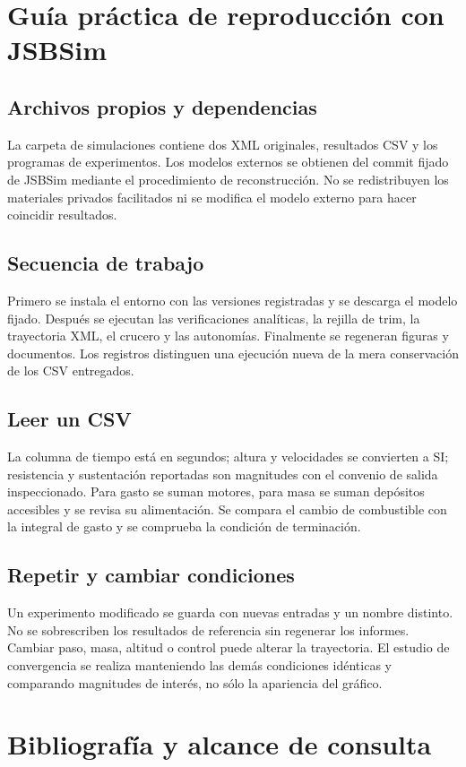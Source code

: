 \chapter{Guía práctica de reproducción con JSBSim}
\section{Archivos propios y dependencias}
La carpeta de simulaciones contiene dos XML originales, resultados CSV y los programas de experimentos. Los modelos externos se obtienen del commit fijado de JSBSim mediante el procedimiento de reconstrucción. No se redistribuyen los materiales privados facilitados ni se modifica el modelo externo para hacer coincidir resultados.

\section{Secuencia de trabajo}
Primero se instala el entorno con las versiones registradas y se descarga el modelo fijado. Después se ejecutan las verificaciones analíticas, la rejilla de trim, la trayectoria XML, el crucero y las autonomías. Finalmente se regeneran figuras y documentos. Los registros distinguen una ejecución nueva de la mera conservación de los CSV entregados.

\section{Leer un CSV}
La columna de tiempo está en segundos; altura y velocidades se convierten a SI; resistencia y sustentación reportadas son magnitudes con el convenio de salida inspeccionado. Para gasto se suman motores, para masa se suman depósitos accesibles y se revisa su alimentación. Se compara el cambio de combustible con la integral de gasto y se comprueba la condición de terminación.

\section{Repetir y cambiar condiciones}
Un experimento modificado se guarda con nuevas entradas y un nombre distinto. No se sobrescriben los resultados de referencia sin regenerar los informes. Cambiar paso, masa, altitud o control puede alterar la trayectoria. El estudio de convergencia se realiza manteniendo las demás condiciones idénticas y comparando magnitudes de interés, no sólo la apariencia del gráfico.

\chapter{Bibliografía y alcance de consulta}\label{app:biblio}
\begingroup\small
\renewcommand{\apartado}[2]{\par\smallskip\noindent\textbf{#1.} #2\par}

\endgroup

